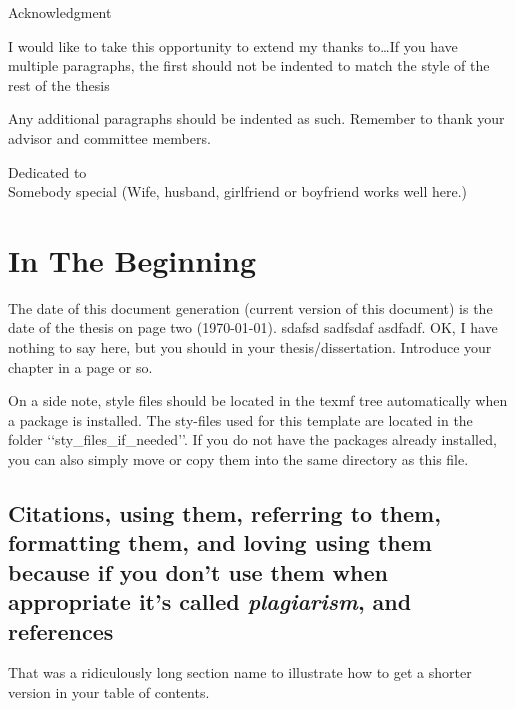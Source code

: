 \documentclass[12pt]{report}
\begin{document}
\begin{singlespace}
\tableofcontents
\listoffigures
\listoftables
\end{singlespace}
%
\newpage
\thispagestyle{plain}
\setlength{\parindent}{0em}
\begin{center}
{\huge Acknowledgment}
\end{center}

I would like to take this opportunity to extend my thanks to\ldots If you have multiple paragraphs, the first should not be indented to match the style of the rest of the thesis

\setlength{\parindent}{2em}
Any additional paragraphs should be indented as such.  Remember to thank your advisor and committee members.
%
\newpage
\thispagestyle{plain}
\vspace*{3in}
\begin{center}
Dedicated to\\
Somebody special (Wife, husband, girlfriend or boyfriend works well
here.)
\end{center}
%
%
%
\newpage
\setcounter{page}{1}
\setlength{\parindent}{2em}
\chapter{In The Beginning}
The date of this document generation (current version of this document) is the date of the thesis on page two (\today).{}
sdafsd sadfsdaf asdfadf. OK, I have nothing to say here, but you should in your thesis/dissertation. Introduce your chapter in a page or so. 

On a side note, style files should be located in the texmf tree automatically when a package is installed.  The sty-files used for this template are located in the folder \lq\lq{}sty\_files\_if\_needed\rq\rq{}.  If you do not have the packages already installed, you can also simply move or copy them into the same directory as this file.

\section[Citations/References (short form of section name)]{Citations, using them, referring to them, formatting them, and loving using them because if you don't use them when appropriate it's called \emph{plagiarism}, and references}
That was a ridiculously long section name to illustrate how to get a shorter version in your table of contents.  
\end{document}
